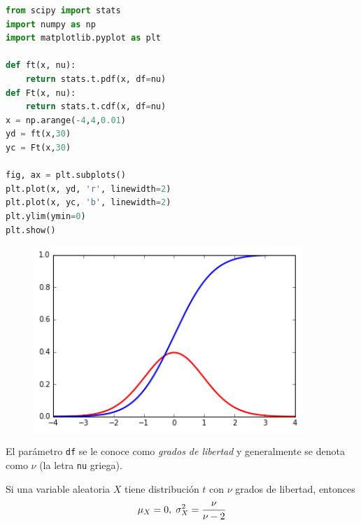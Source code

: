 \begin{lstlisting}[language=Python, caption=Distribución $t$ en \texttt{Python}]
from scipy import stats
import numpy as np
import matplotlib.pyplot as plt

def ft(x, nu):
    return stats.t.pdf(x, df=nu)
def Ft(x, nu):
    return stats.t.cdf(x, df=nu)
x = np.arange(-4,4,0.01)
yd = ft(x,30)
yc = Ft(x,30)

fig, ax = plt.subplots()
plt.plot(x, yd, 'r', linewidth=2)
plt.plot(x, yc, 'b', linewidth=2)
plt.ylim(ymin=0)
plt.show()
\end{lstlisting}



\begin{figure}
 \centering
 \includegraphics[height=7cm,keepaspectratio=true]{./images/tCDF.png}
\end{figure}



El parámetro \texttt{df} se le conoce como \emph{grados de libertad} y generalmente se denota como $\nu$ (la letra \texttt{nu} griega).


 Si una variable aleatoria $X$ tiene distribución $t$ con $\nu$ grados de libertad, entonces
 \begin{align}
  \mu_{X}=0, \; \sigma^{2}_{X}=\dfrac{\nu}{\nu-2}
 \end{align}






